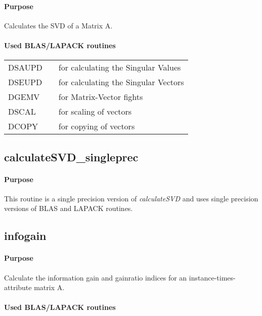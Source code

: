 \documentclass[a4paper,10pt]{scrartcl}
\begin{document}
			\paragraph{Purpose}

			Calculates the SVD of a Matrix A.

			\paragraph{Used BLAS/LAPACK routines}

			\begin{tabular}{lcl}
				DSAUPD && for calculating the Singular Values\\
				DSEUPD && for calculating the Singular Vectors\\
				DGEMV && for Matrix-Vector fights\\
				DSCAL && for scaling of vectors\\
				DCOPY && for copying of vectors\\
			\end{tabular}		

		\subsection{calculateSVD\_singleprec}

			\paragraph{Purpose}

			This routine is a single precision version of \emph{calculateSVD} and uses single precision versions
			of BLAS and LAPACK routines.	

		\subsection{infogain}

			\paragraph{Purpose}

			Calculate the information gain and gainratio indices for an instance-times-attribute matrix A.

			\paragraph{Used BLAS/LAPACK routines}
\end{document}
